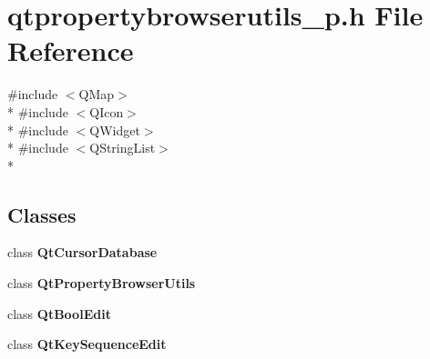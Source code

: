 \section{qtpropertybrowserutils\+\_\+p.\+h File Reference}
\label{qtpropertybrowserutils__p_8h}
{\ttfamily \#include $<$Q\+Map$>$}\\*
{\ttfamily \#include $<$Q\+Icon$>$}\\*
{\ttfamily \#include $<$Q\+Widget$>$}\\*
{\ttfamily \#include $<$Q\+String\+List$>$}\\*
\subsection*{Classes}
\begin{DoxyCompactItemize}
\item 
class {\bf Qt\+Cursor\+Database}
\item 
class {\bf Qt\+Property\+Browser\+Utils}
\item 
class {\bf Qt\+Bool\+Edit}
\item 
class {\bf Qt\+Key\+Sequence\+Edit}
\end{DoxyCompactItemize}
